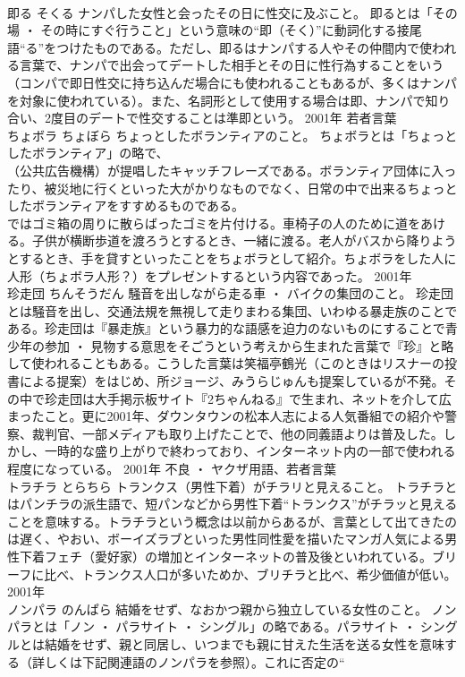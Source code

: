 \documentclass[8pt]{extreport}
\begin{document}
\begin{CJK}{UTF8}{min}
\\	即る	そくる	ナンパした女性と会ったその日に性交に及ぶこと。	即るとは「その場 ・ その時にすぐ行うこと」という意味の“即（そく）”に動詞化する接尾語“る”をつけたものである。ただし、即るはナンパする人やその仲間内で使われる言葉で、ナンパで出会ってデートした相手とその日に性行為することをいう（コンパで即日性交に持ち込んだ場合にも使われることもあるが、多くはナンパを対象に使われている）。また、名詞形として使用する場合は即、ナンパで知り合い、2度目のデートで性交することは準即という。	2001年	若者言葉	
\\	ちょボラ	ちょぼら	ちょっとしたボランティアのこと。	ちょボラとは「ちょっとしたボランティア」の略で、
\\	（公共広告機構）が提唱したキャッチフレーズである。ボランティア団体に入ったり、被災地に行くといった大がかりなものでなく、日常の中で出来るちょっとしたボランティアをすすめるものである。
\\	ではゴミ箱の周りに散らばったゴミを片付ける。車椅子の人のために道をあける。子供が横断歩道を渡ろうとするとき、一緒に渡る。老人がバスから降りようとするとき、手を貸すといったことをちょボラとして紹介。ちょボラをした人に人形（ちょボラ人形？）をプレゼントするという内容であった。	2001年	
\\	珍走団	ちんそうだん	騒音を出しながら走る車 ・ バイクの集団のこと。	珍走団とは騒音を出し、交通法規を無視して走りまわる集団、いわゆる暴走族のことである。珍走団は『暴走族』という暴力的な語感を迫力のないものにすることで青少年の参加 ・ 見物する意思をそごうという考えから生まれた言葉で『珍』と略して使われることもある。こうした言葉は笑福亭鶴光（このときはリスナーの投書による提案）をはじめ、所ジョージ、みうらじゅんも提案しているが不発。その中で珍走団は大手掲示板サイト『2ちゃんねる』で生まれ、ネットを介して広まったこと。更に2001年、ダウンタウンの松本人志による人気番組での紹介や警察、裁判官、一部メディアも取り上げたことで、他の同義語よりは普及した。しかし、一時的な盛り上がりで終わっており、インターネット内の一部で使われる程度になっている。	2001年	不良 ・ ヤクザ用語、若者言葉
\\	トラチラ	とらちら	トランクス（男性下着）がチラリと見えること。	トラチラとはパンチラの派生語で、短パンなどから男性下着“トランクス”がチラッと見えることを意味する。トラチラという概念は以前からあるが、言葉として出てきたのは遅く、やおい、ボーイズラブといった男性同性愛を描いたマンガ人気による男性下着フェチ（愛好家）の増加とインターネットの普及後といわれている。ブリーフに比べ、トランクス人口が多いためか、ブリチラと比べ、希少価値が低い。	2001年	
\\	ノンパラ	のんぱら	結婚をせず、なおかつ親から独立している女性のこと。	ノンパラとは「ノン ・ パラサイト ・ シングル」の略である。パラサイト ・ シングルとは結婚をせず、親と同居し、いつまでも親に甘えた生活を送る女性を意味する（詳しくは下記関連語のノンパラを参照）。これに否定の“

\end{CJK}
\end{document}
